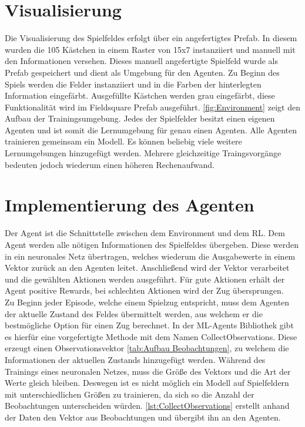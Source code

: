 \section{Visualisierung}
Die Visualisierung des Spielfeldes erfolgt über ein angefertigtes Prefab. In diesem wurden die 105 Kästchen in einem Raster von 15x7 instanziiert und manuell mit den Informationen versehen. Dieses manuell angefertigte Spielfeld wurde als Prefab gespeichert und dient als Umgebung für den Agenten.
Zu Beginn des Spiels werden die Felder instanziiert und in die Farben der hinterlegten Information eingefärbt. Ausgefüllte Kästchen werden grau eingefärbt, diese Funktionalität wird im Fieldsquare Prefab ausgeführt. \ref{fig:Environment} zeigt den Aufbau der Trainingsumgebung. Jedes der Spielfelder besitzt einen eigenen Agenten und ist somit die Lernumgebung für genau einen Agenten. Alle Agenten trainieren gemeinsam ein Modell. Es können beliebig viele weitere Lernumgebungen hinzugefügt werden. Mehrere gleichzeitige Traingsvorgänge bedeuten jedoch wiederum einen höheren Rechenaufwand.


\section{Implementierung des Agenten}
Der Agent ist die Schnittstelle zwischen dem Environment und dem RL.
Dem Agent werden alle nötigen Informationen des Spielfeldes übergeben. Diese werden in ein neuronales Netz übertragen, welches wiederum die Ausgabewerte in einem Vektor zurück an den Agenten leitet.
Anschließend wird der Vektor verarbeitet und die gewählten Aktionen werden ausgeführt.
Für gute Aktionen erhält der Agent positive Rewards, bei schlechten Aktionen wird der Zug übersprungen. \\
Zu Beginn jeder Episode, welche einem Spielzug entspricht, muss dem Agenten der aktuelle Zustand des Feldes übermittelt werden, aus welchem er die bestmögliche Option für einen Zug berechnet. In der ML-Agents Bibliothek gibt es hierfür eine vorgefertigte Methode mit dem Namen CollectObservations. Diese erzeugt einen Observationsvektor \ref{tab:Aufbau Beobachtungen}, zu welchem die Informationen der aktuellen Zustands hinzugefügt werden.
Während des Trainings eines neuronalen Netzes, muss die Größe des Vektors und die Art der Werte gleich bleiben. Deswegen ist es nicht möglich ein Modell auf Spielfeldern mit unterschiedlichen Größen zu trainieren, da sich so die Anzahl der Beobachtungen unterscheiden würden.
\ref{lst:CollectObservations} erstellt anhand der Daten den Vektor aus Beobachtungen und übergibt ihn an den Agenten.



